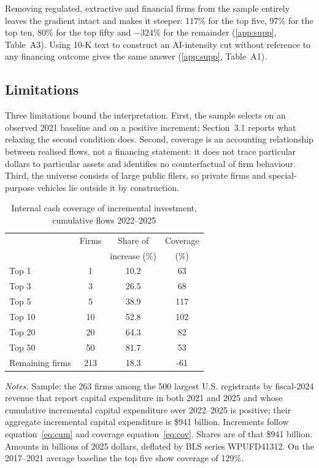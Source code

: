\documentclass[preprint,11pt]{elsarticle}
\begin{document}
Removing regulated, extractive and financial firms from the sample entirely leaves the gradient
intact and makes it steeper: 117\% for the top five, 97\% for the top ten, 80\% for the top fifty
and $-324$\% for the remainder (\ref{app:supp}, Table~A3). Using 10-K text to construct an
AI-intensity cut without reference to any financing outcome gives the same answer (\ref{app:supp},
Table~A1).

\subsection{Limitations}\label{sec:lim}
Three limitations bound the interpretation. First, the sample selects on an observed 2021 baseline
and on a positive increment; Section~3.1 reports what relaxing the second condition does. Second,
coverage is an accounting relationship between realised flows, not a financing statement: it does
not trace particular dollars to particular assets and identifies no counterfactual of firm
behaviour. Third, the universe consists of large public filers, so private firms and special-purpose
vehicles lie outside it by construction.

\begin{table}[htbp]
\centering
\caption{Internal cash coverage of incremental investment, cumulative flows 2022--2025}
\label{tab:ladder}
\small
\begin{tabular}{l S[table-format=3.0] S[table-format=2.1] S[table-format=-3.0]}
\toprule
& {Firms} & {Share of} & {Coverage} \\
& & {increase (\%)} & {(\%)} \\
\midrule
\quad Top 1              & 1   & 10.2 & 63   \\
\quad Top 3              & 3   & 26.5 & 68   \\
\quad Top 5              & 5   & 38.9 & 117  \\
\quad Top 10             & 10  & 52.8 & 102  \\
\quad Top 20             & 20  & 64.3 & 82   \\
\quad Top 50             & 50  & 81.7 & 53   \\
\quad Remaining firms    & 213 & 18.3 & -61  \\
\bottomrule
\end{tabular}
\par\vspace{5pt}
\begin{minipage}{0.96\linewidth}\footnotesize
\textit{Notes.} Sample: the 263 firms among the 500 largest U.S. registrants by fiscal-2024 revenue
that report capital expenditure in both 2021 and 2025 and whose cumulative incremental capital
expenditure over 2022--2025 is positive; their aggregate incremental capital expenditure is \$941
billion. Increments follow equation~\eqref{eq:cum} and coverage equation~\eqref{eq:cov}. Shares are
of that \$941 billion. Amounts in billions of 2025 dollars, deflated by BLS series WPUFD41312. On
the 2017--2021 average baseline the top five show coverage of 129\%.
\end{minipage}
\end{table}
\end{document}
